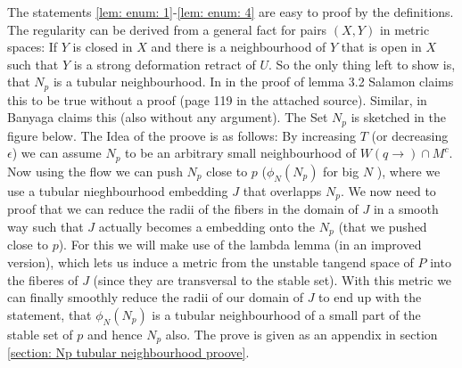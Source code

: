 \begin{Iprove}
	The statements \ref{lem: enum: 1}-\ref{lem: enum: 4} are easy to proof by the definitions. The regularity can be derived from a general fact for pairs $(X,Y)$ in metric spaces: If $Y$ is closed in $X$ and there is a neighbourhood of $Y$ that is open in $X$ such that $Y$ is a strong deformation retract of $U$. So the only thing left to show is, that $N_p$ is a tubular neighbourhood. In \cite{Salamon1990} in the proof of lemma 3.2 Salamon claims this to be true without a proof (page 119 in the attached source). Similar, in \cite{banyaga2004lectures} Banyaga claims this (also without any argument).
	The Set $N_p$ is sketched in the figure below. 
	The Idea of the proove is as follows: By increasing $T$ (or decreasing $\epsilon$) we can assume $N_p$ to be an arbitrary small neighbourhood of $W(q\to) \cap M^c$. Now using the flow we can push $N_p$ close to $p$ ($\phi_N(N_p)$ for big $N$ ), where we use a tubular nieghbourhood embedding $J$ that overlapps $N_p$. We now need to proof that we can reduce the radii of the fibers in the domain of $J$ in a smooth way such that $J$ actually becomes a embedding onto the $N_p$ (that we pushed close to $p$). For this we will make use of the lambda lemma (in an improved version), which lets us induce a metric from the unstable tangend space of $P$ into the fiberes of $J$ (since they are transversal to the stable set). With this metric we can finally smoothly reduce the radii of our domain of $J$ to end up with the statement, that $\phi_N(N_p)$ is a tubular neighbourhood of a small part of the stable set of $p$ and hence $N_p$ also. The prove is given as an appendix in section \ref{section: Np tubular neighbourhood proove}.
\end{Iprove}
